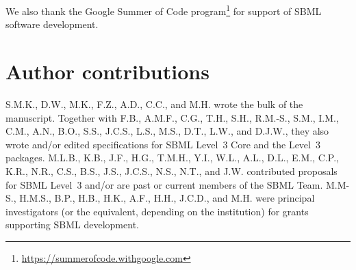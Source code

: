 \documentclass{sbml-paper}
\begin{document}
We also thank the Google Summer of Code program\footnote{\url{https://summerofcode.withgoogle.com}} for support of SBML software development.


\section*{Author contributions}

S.M.K., D.W., M.K., F.Z., A.D., C.C., and M.H. wrote the bulk of the manuscript.  Together with F.B., A.M.F., C.G., T.H., S.H., R.M.-S., S.M., I.M., C.M., A.N., B.O., S.S., J.C.S., L.S., M.S., D.T., L.W., and D.J.W., they also wrote and/or edited specifications for SBML Level~3 Core and the Level~3 packages.  M.L.B., K.B., J.F., H.G., T.M.H., Y.I., W.L., A.L., D.L., E.M., C.P., K.R., N.R., C.S., B.S., J.S., J.C.S., N.S., N.T., and J.W. contributed proposals for SBML Level~3 and/or are past or current members of the SBML Team.  M.M-S., H.M.S., B.P., H.B., H.K., A.F., H.H., J.C.D., and M.H. were principal investigators (or the equivalent, depending on the institution) for grants supporting SBML development.



\clearpage



\end{document}
